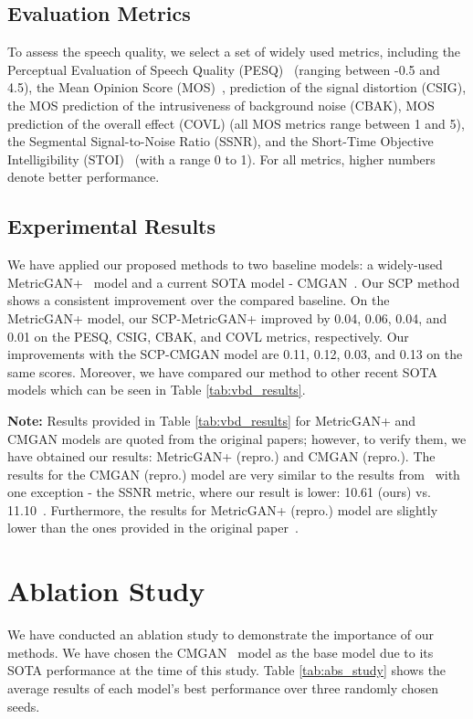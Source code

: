 \documentclass{article}
\begin{document}
\subsection{Evaluation Metrics}
To assess the speech quality, we select a set of widely used metrics, including the Perceptual Evaluation of Speech Quality (PESQ)~\cite{Rix2001PerceptualEO} (ranging between -0.5 and 4.5), the Mean Opinion Score (MOS)~\cite{4389058}, prediction of the signal distortion (CSIG), the MOS prediction of the intrusiveness of background noise (CBAK), MOS prediction of the overall effect (COVL) (all MOS metrics range between 1 and 5), the Segmental Signal-to-Noise Ratio (SSNR), and the Short-Time Objective Intelligibility (STOI)~\cite{5495701} (with a range 0 to 1). For all metrics, higher numbers denote better performance.

\subsection{Experimental Results}
We have applied our proposed methods to two baseline models: a widely-used MetricGAN+~\cite{fu2021metricgan+} model and a current SOTA model - CMGAN~\cite{cao2022cmgan}. Our SCP method shows a consistent improvement over the compared baseline. On the MetricGAN+ model, our SCP-MetricGAN+ improved by 0.04, 0.06, 0.04, and 0.01 on the PESQ, CSIG, CBAK, and COVL metrics, respectively. Our improvements with the SCP-CMGAN model are 0.11, 0.12, 0.03, and 0.13 on the same scores. Moreover, we have compared our method to other recent SOTA models which can be seen in Table \ref{tab:vbd_results}.


\textbf{Note:} Results provided in Table \ref{tab:vbd_results} for MetricGAN+ and CMGAN models are quoted from the original papers; however, to verify them, we have obtained our results: MetricGAN+ (repro.) and CMGAN (repro.). The results for the CMGAN (repro.) model are very similar to the results from~\cite{cao2022cmgan} with one exception - the SSNR metric, where our result is lower: 10.61 (ours) vs. 11.10~\cite{cao2022cmgan}. Furthermore, the results for MetricGAN+ (repro.) model are slightly lower than the ones provided in the original paper~\cite{fu2021metricgan+}.

\section{Ablation Study}\label{sec:ablstudy}

We have conducted an ablation study to demonstrate the importance of our methods. We have chosen the CMGAN~\cite{cao2022cmgan} model as the base model due to its SOTA performance at the time of this study. Table \ref{tab:abs_study} shows the average results of each model's best performance over three randomly chosen seeds.
\end{document}
